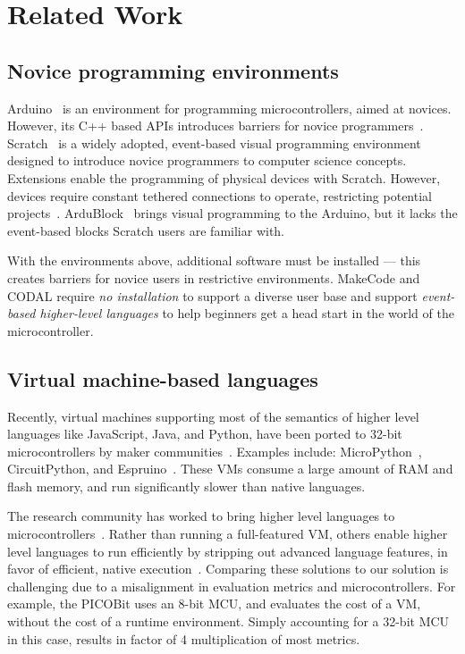 \section{Related Work}
\label{sec:related}
\subsection{Novice programming environments}

Arduino~\cite{buildingArduino2014} is an environment for programming microcontrollers, aimed at novices. However, its C++ based APIs introduces barriers for novice programmers~\cite{blikstein2013gears}. Scratch~\cite{ScratchCACM2009} is a widely adopted, event-based visual programming environment designed to introduce novice programmers to computer science concepts. Extensions enable the programming of physical devices with Scratch. However, devices require constant tethered connections to operate, restricting potential projects~\cite{dougherty2012maker}. ArduBlock~\cite{Ardubloc28:online} brings visual programming to the Arduino, but it lacks the event-based blocks Scratch users are familiar with.

With the environments above, additional software must be installed --- this creates barriers for novice users in restrictive environments. MakeCode and CODAL require \emph{no installation} to support a diverse user base and support \emph{event-based higher-level languages} to help beginners get a head start in the world of the microcontroller.

\subsection{Virtual machine-based languages}

Recently, virtual machines supporting most of the semantics of higher level languages like JavaScript, Java, and Python, have been ported to 32-bit microcontrollers by maker communities~\cite{dougherty2012maker}. Examples include: MicroPython~\cite{MicroPython}, CircuitPython, and Espruino~\cite{espruinoBook}. These VMs consume a large amount of RAM and flash memory, and run significantly slower than native languages.

The research community has worked to bring higher level languages to microcontrollers~\cite{koshy2005vmstar,st2009picobit,vaugon2015programming}. Rather than running a full-featured VM, others enable higher level languages to run efficiently by stripping out advanced language features, in favor of efficient, native execution~\cite{varma2004java}. Comparing these solutions to our solution is challenging due to a misalignment in evaluation metrics and microcontrollers. For example, the PICOBit uses an 8-bit MCU, and evaluates the cost of a VM, without the cost of a runtime environment. Simply accounting for a 32-bit MCU in this case, results in factor of 4 multiplication of most metrics.

